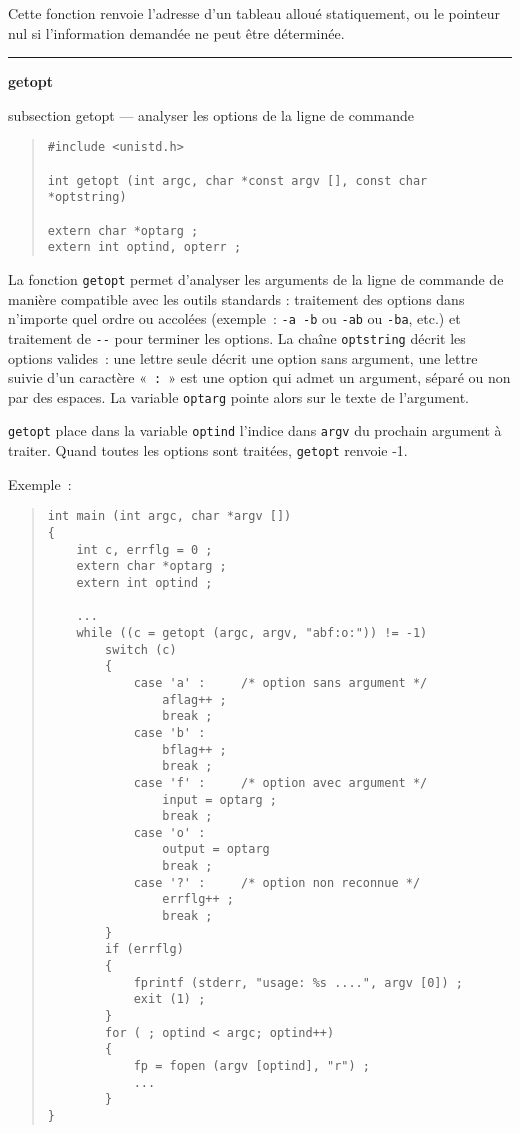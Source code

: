 \documentclass [twoside] {report}
\newcommand {\primitive} [1]
    {
	\phantomsection
	{\large \textbf {#1}}
	\addcontentsline {toc} {subsection} {#1}
    }
\newcommand {\separation}
    {
	\vspace {5mm}
	\nopagebreak
	\hrule
    }
\begin{document}
Cette fonction renvoie l'adresse d'un tableau alloué statiquement,
ou le pointeur nul si l'information demandée ne peut être déterminée.


\separation 
\primitive {getopt} --- analyser les options de la ligne de commande

\begin {quote}
\begin {verbatim}
#include <unistd.h>

int getopt (int argc, char *const argv [], const char *optstring)

extern char *optarg ;
extern int optind, opterr ;
\end{verbatim}
\end {quote}

La fonction \texttt {getopt} permet d'analyser les arguments de
la ligne de commande de manière compatible avec les outils standards :
traitement des options dans n'importe quel ordre ou accolées (exemple~:
\verb|-a -b| ou \verb|-ab| ou \verb|-ba|, etc.) et traitement de
\verb|--| pour terminer les options.
La chaîne \texttt {optstring} décrit les
options valides~: une lettre seule décrit une option sans
argument, une lettre suivie d'un caractère «~\texttt {:}~» est une
option qui admet un argument, séparé ou non par des espaces.
La variable \texttt {optarg} pointe alors sur le texte de
l'argument.

\texttt {getopt} place dans la variable \texttt {optind} l'indice dans
\texttt {argv} du prochain argument à traiter. Quand toutes les
options sont traitées, \texttt {getopt} renvoie -1.

Exemple~:

\begin {quote}
\begin {verbatim}
int main (int argc, char *argv [])
{
    int c, errflg = 0 ;
    extern char *optarg ;
    extern int optind ;

    ...
    while ((c = getopt (argc, argv, "abf:o:")) != -1)
        switch (c)
        {
            case 'a' :     /* option sans argument */
                aflag++ ;
                break ;
            case 'b' :
                bflag++ ;
                break ;
            case 'f' :     /* option avec argument */
                input = optarg ;
                break ;
            case 'o' :
                output = optarg
                break ;
            case '?' :     /* option non reconnue */
                errflg++ ;
                break ;
        }
        if (errflg)
        {
            fprintf (stderr, "usage: %
            exit (1) ;
        }
        for ( ; optind < argc; optind++)
        {
            fp = fopen (argv [optind], "r") ;
            ...
        }
}
\end{verbatim}
\end {quote}
\end{document}
